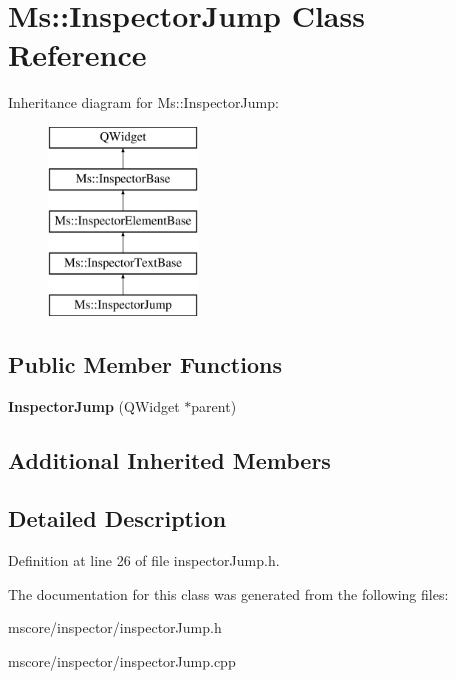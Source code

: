 \hypertarget{class_ms_1_1_inspector_jump}{}\section{Ms\+:\+:Inspector\+Jump Class Reference}
\label{class_ms_1_1_inspector_jump}
Inheritance diagram for Ms\+:\+:Inspector\+Jump\+:\begin{figure}[H]
\begin{center}
\leavevmode
\includegraphics[height=5.000000cm]{class_ms_1_1_inspector_jump}
\end{center}
\end{figure}
\subsection*{Public Member Functions}
\begin{DoxyCompactItemize}
\item 
\mbox{\label{class_ms_1_1_inspector_jump_acc6ff6108e3afff08963a8146c42b1f9}} 
{\bfseries Inspector\+Jump} (Q\+Widget $\ast$parent)
\end{DoxyCompactItemize}
\subsection*{Additional Inherited Members}


\subsection{Detailed Description}


Definition at line 26 of file inspector\+Jump.\+h.



The documentation for this class was generated from the following files\+:\begin{DoxyCompactItemize}
\item 
mscore/inspector/inspector\+Jump.\+h\item 
mscore/inspector/inspector\+Jump.\+cpp\end{DoxyCompactItemize}
